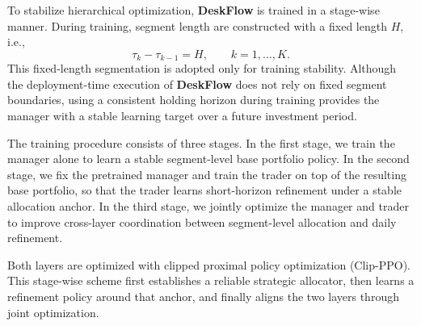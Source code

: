 \documentclass[letterpaper]{article} %
\begin{document}
To stabilize hierarchical optimization, \textbf{DeskFlow} is trained in a stage-wise manner. During training, segment length are constructed with a fixed length 
\(H\), i.e.,
\[
\tau_k-\tau_{k-1}=H,\qquad k=1,\dots,K.
\]
This fixed-length segmentation is adopted only for training stability. Although the deployment-time execution of \textbf{DeskFlow} does not rely on fixed segment boundaries, using a consistent holding horizon during training provides the manager with a stable learning target over a future investment period. 

The training procedure consists of three stages. In the first stage, we train the manager alone to learn a stable segment-level base portfolio policy. In the second stage, we fix the pretrained manager and train the trader on top of the resulting base portfolio, so that the trader learns short-horizon refinement under a stable allocation anchor. In the third stage, we jointly optimize the manager and trader to improve cross-layer coordination between segment-level allocation and daily refinement.

Both layers are optimized with clipped proximal policy optimization (Clip-PPO)\citep{clip-ppo}. This stage-wise scheme first establishes a reliable strategic allocator, then learns a refinement policy around that anchor, and finally aligns the two layers through joint optimization.





\end{document}
